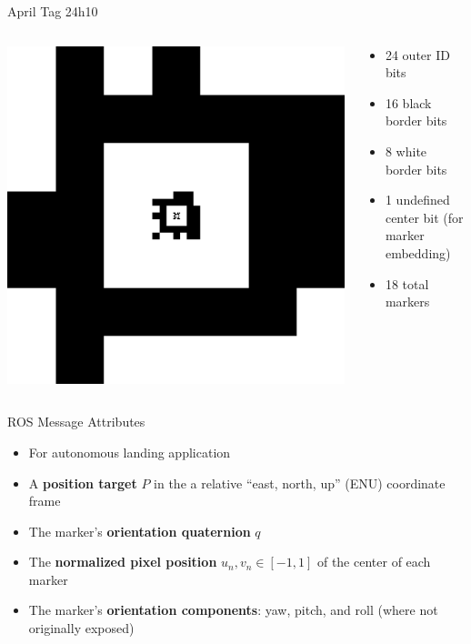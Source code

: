 \documentclass[aspectratio=169]{beamer}
\begin{document}
\begin{frame}{April Tag 24h10}
	\begin{columns}
	\begin{column}{0.4\textwidth}
		\centering
		\includegraphics[width=\linewidth]{./images/tagCustom24h10_00002_00001_00000.png}
	\end{column}
	\begin{column}{0.6\textwidth}
	\begin{itemize}
		\item 24 outer ID bits
		\item 16 black border bits
		\item 8 white border bits
		\item 1 undefined center bit (for marker embedding)
		\item 18 total markers
	\end{itemize}
	\end{column}
	\end{columns}
\end{frame}

\begin{frame}{ROS Message Attributes}
	\begin{itemize}
		\item For autonomous landing application
		\item A \textbf{position target} $P$ in the a relative
			``east, north, up'' (ENU) coordinate frame
		\item The marker's \textbf{orientation quaternion} $q$
		\item The \textbf{normalized pixel position} $u_n, v_n \in [-1,1]$
			of the center of each marker
		\item The marker's \textbf{orientation components}: yaw, pitch, and roll
			(where not originally exposed)
	\end{itemize}
\end{frame}
\end{document}

